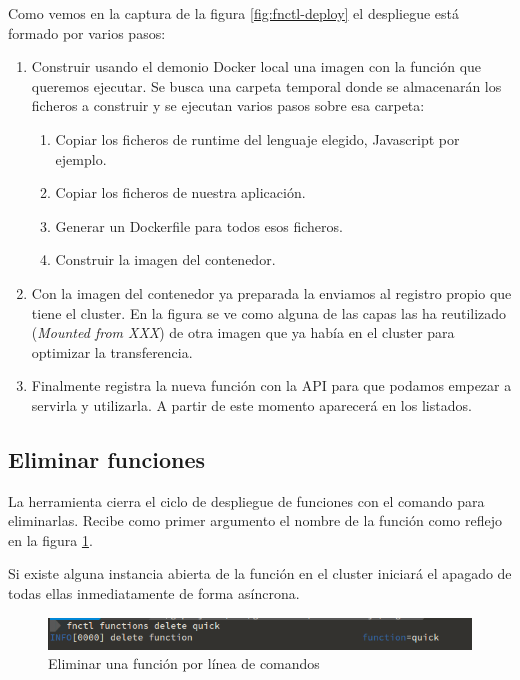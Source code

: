 Como vemos en la captura de la figura \ref{fig:fnctl-deploy} el despliegue está formado por varios pasos:
\begin{enumerate}
    \item Construir usando el demonio Docker local una imagen con la función que queremos ejecutar. Se busca una carpeta temporal donde se almacenarán los ficheros a construir y se ejecutan varios pasos sobre esa carpeta:
        \begin{enumerate}
            \item Copiar los ficheros de runtime del lenguaje elegido, Javascript por ejemplo.
            \item Copiar los ficheros de nuestra aplicación.
            \item Generar un Dockerfile para todos esos ficheros.
            \item Construir la imagen del contenedor.
        \end{enumerate}
    \item Con la imagen del contenedor ya preparada la enviamos al registro propio que tiene el cluster. En la figura se ve como alguna de las capas las ha reutilizado (\emph{Mounted from XXX}) de otra imagen que ya había en el cluster para optimizar la transferencia.
    \item Finalmente registra la nueva función con la API para que podamos empezar a servirla y utilizarla. A partir de este momento aparecerá en los listados.
\end{enumerate}

\subsection{Eliminar funciones}

La herramienta cierra el ciclo de despliegue de funciones con el comando para eliminarlas. Recibe como primer argumento el nombre de la función como reflejo en la figura \ref{fig:fnctl-delete}.

Si existe alguna instancia abierta de la función en el cluster iniciará el apagado de todas ellas inmediatamente de forma asíncrona.

\begin{figure}[H]
    \centering
    \includegraphics[width=\textwidth]{../images/fnctl/delete.png}
    \caption{Eliminar una función por línea de comandos}
    \label{fig:fnctl-delete}
\end{figure}

